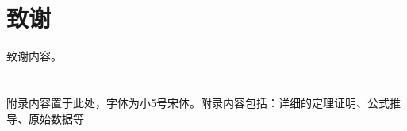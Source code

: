\documentclass{cjc}
\begin{document}
\section*{致谢}

致谢内容。


\nocite{*}






\appendix

\section{}

附录内容置于此处，字体为小5号宋体。附录内容包括：详细的定理证明、公式推导、原始数据等










\end{document}
